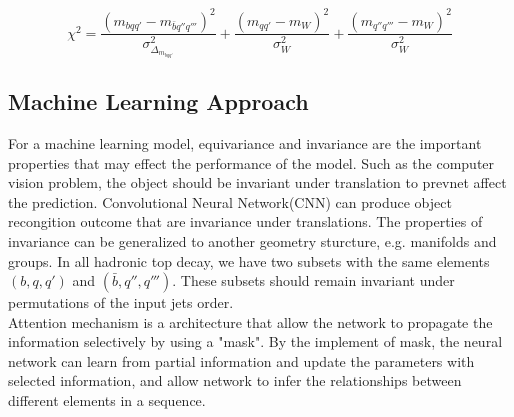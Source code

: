 \begin{equation}
	\chi^{2} = \frac{(m_{bqq'} - m_{\bar{b}q''q'''})^{2}}{\sigma^{2}_{\Delta_{m_{bqq'}}}}  + \frac{(m_{qq'} - m_{W})^{2}}{\sigma^{2}_{W}} + \frac{(m _{q''q'''} - m_{W})^{2}}{\sigma^{2}_{W}}
\end{equation} 


\subsection{Machine Learning Approach}\label{subsec:ML approach}

For a machine learning model, equivariance and invariance are the important properties that may effect the performance of the model. Such as the computer vision problem, the object should be invariant under translation to prevnet affect the prediction. Convolutional Neural Network(CNN) can produce object recongition outcome that are invariance under translations. The properties of invariance can be generalized to another geometry sturcture, e.g. manifolds and groups. In all hadronic top decay, we have two subsets with the same elements $(b, q, q')$ and $(\bar{b}, q'', q''')$. These subsets should remain invariant under permutations of the input jets order. 
\\
Attention mechanism is a architecture that allow the network to propagate the information selectively by using a "mask". By the implement of mask, the neural network can learn from partial information and update the parameters with selected information, and allow network to infer the relationships between different elements in a sequence.



